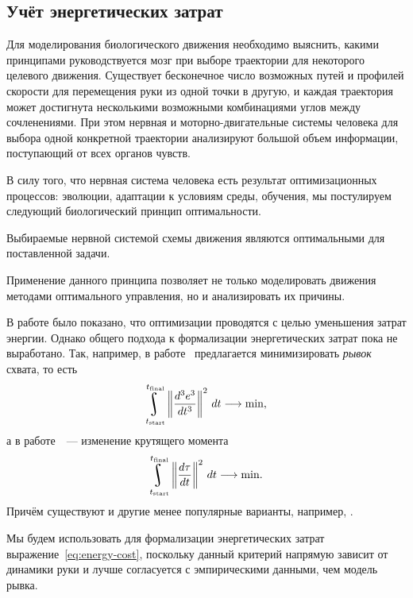 \documentclass[../../doc.tex]{subfiles}
\begin{document}
    \subsection{Учёт энергетических затрат}

    Для моделирования биологического движения необходимо выяснить, какими принципами руководствуется мозг при выборе траектории для некоторого целевого движения.
    Существует бесконечное число возможных путей и профилей скорости для перемещения руки из одной точки в другую,
    и каждая траектория может достигнута несколькими возможными комбинациями углов между сочленениями.
    При этом нервная и моторно-двигательные системы человека для выбора одной конкретной траектории анализируют большой объем информации, поступающий от всех органов чувств.

    В силу того, что нервная система человека есть результат оптимизационных процессов:
    эволюции, адаптации к условиям среды, обучения,
    мы постулируем следующий биологический принцип оптимальности.
    
    \begin{assertion}
        Выбираемые нервной системой схемы движения являются оптимальными для поставленной задачи.
    \end{assertion}
    
    Применение данного принципа позволяет не только моделировать движения методами оптимального управления, но и анализировать их причины.

    В работе \cite{todorov2002} было показано, что оптимизации проводятся с целью уменьшения затрат энергии.
    Однако общего подхода к формализации энергетических затрат пока не выработано.
    Так, например, в работе~\cite{hogan1984} предлагается минимизировать \textit{рывок} схвата, то есть
    $$
        \uint\limits_{t_{\textnormal{start}}}^{t_{\textnormal{final}}}\left\|
            \frac{d^3e^3}{dt^3}
        \right\|^2\, dt \longrightarrow \textnormal{min},
    $$
    а в работе~\cite{uno1989}~--- изменение крутящего момента
    \begin{equation}\label{eq:energy-cost}
        \uint\limits_{t_{\textnormal{start}}}^{t_{\textnormal{final}}}\left\|
            \frac{d\tau}{dt}
        \right\|^2\, dt \longrightarrow \textnormal{min}.
    \end{equation}
    Причём существуют и другие менее популярные варианты, например, \cite{harris1998}.
    
    Мы будем использовать для формализации энергетических затрат выражение~\eqref{eq:energy-cost},
    поскольку данный критерий напрямую зависит от динамики руки и лучше согласуется с эмпирическими данными,
    чем модель рывка.
    
    \ifSubfilesClassLoaded{
        \nocite{*}
        \clearpage
        
        
    }{}
\end{document}
